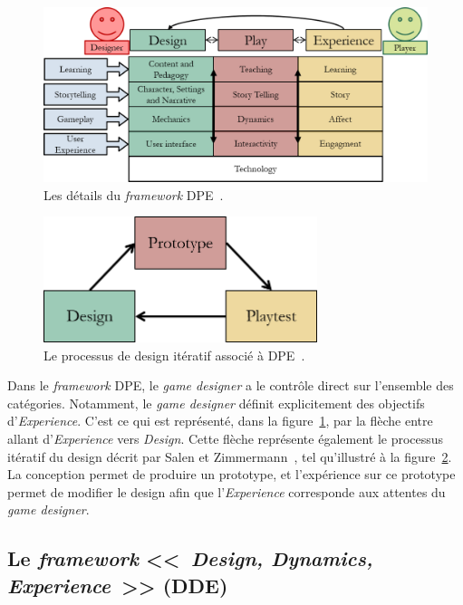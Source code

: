 \begin{figure}
    \centering
    \includegraphics[width=14cm]{10_img/chap3/dpe_extended.png} 
    \caption{Les d\'etails du \emph{framework} DPE~\cite{Winn2011}.}
    \label{fig.dpe_extended}
\end{figure}


\begin{figure}
    \centering
    \includegraphics[width=8cm]{10_img/chap3/iteration_prototype.png} 
    \caption{Le processus de design itératif associ\'e \`a DPE~\cite{Winn2011}.}
    \label{fig.dpe_iteratif}
\end{figure}


Dans le \emph{framework} DPE, le \emph{game designer} a le contrôle direct sur l'ensemble des catégories. 
Notamment, le \emph{game designer} définit explicitement des objectifs d'\emph{Experience}. 
C'est ce qui est représenté, dans la figure~\ref{fig.dpe_extended}, par la flèche entre allant d'\emph{Experience} vers \emph{Design}. 
Cette flèche représente également le processus itératif du design décrit par Salen et Zimmermann~\cite{Salen2013}, tel qu'illustr\'e \`a la figure~\ref{fig.dpe_iteratif}. 
La conception permet de produire un prototype, et l'expérience sur ce prototype permet de modifier le design afin que l'\emph{Experience} corresponde aux attentes du \emph{game designer}.




\subsection{Le \emph{framework} <<~\emph{Design, Dynamics, Experience}~>> (DDE)}
\label{sect.MDA_DDE}


